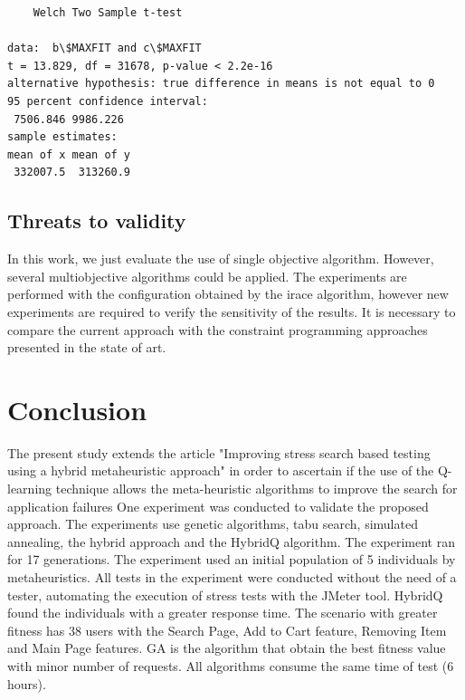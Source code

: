\documentclass[espaco=umemeio,chapter=TITLE,twoside,openright]{abnt}
\begin{document}
\begin{lstlisting}
	Welch Two Sample t-test

data:  b\$MAXFIT and c\$MAXFIT
t = 13.829, df = 31678, p-value < 2.2e-16
alternative hypothesis: true difference in means is not equal to 0
95 percent confidence interval:
 7506.846 9986.226
sample estimates:
mean of x mean of y 
 332007.5  313260.9 

\end{lstlisting}



\subsection{Threats to validity}

In this work, we just evaluate the use of single objective algorithm. However, several multiobjective algorithms could be applied.  The experiments are performed with the configuration obtained by the irace algorithm, however new experiments are required to verify the sensitivity of the results. It is necessary to compare the current approach with the constraint programming approaches presented in the state of art.



\section{Conclusion}

The present study extends the article "Improving stress search based testing using a hybrid metaheuristic approach" in order to ascertain if the use of the Q-learning technique allows the meta-heuristic algorithms to improve the search for application failures One experiment was conducted to validate the proposed approach. The experiments use genetic algorithms, tabu search, simulated annealing, the hybrid approach and the HybridQ algorithm. The experiment ran for 17 generations. The experiment used an initial population of 5 individuals by metaheuristics. All tests in the experiment were conducted without the need of a tester, automating the execution of stress tests with the JMeter tool.  HybridQ found the individuals with a greater response time. The scenario with greater fitness has 38 users with the Search Page, Add to Cart feature, Removing Item and Main Page features. GA is the algorithm that obtain the best fitness value with minor number of requests. All algorithms consume the same time of test (6 hours). 


\FloatBarrier
\end{document}
